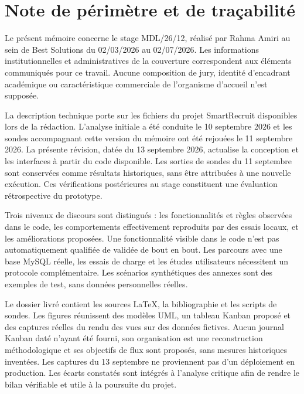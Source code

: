 \chapter*{Note de périmètre et de traçabilité}
Le présent mémoire concerne le stage MDL/26/12, réalisé par Rahma Amiri au sein de Best Solutions du 02/03/2026 au 02/07/2026. Les informations institutionnelles et administratives de la couverture correspondent aux éléments communiqués pour ce travail. Aucune composition de jury, identité d'encadrant académique ou caractéristique commerciale de l'organisme d'accueil n'est supposée.

La description technique porte sur les fichiers du projet SmartRecruit disponibles lors de la rédaction. L'analyse initiale a été conduite le 10 septembre 2026 et les sondes accompagnant cette version du mémoire ont été rejouées le 11 septembre 2026. La présente révision, datée du 13 septembre 2026, actualise la conception et les interfaces à partir du code disponible. Les sorties de sondes du 11 septembre sont conservées comme résultats historiques, sans être attribuées à une nouvelle exécution. Ces vérifications postérieures au stage constituent une évaluation rétrospective du prototype.

Trois niveaux de discours sont distingués : les fonctionnalités et règles observées dans le code, les comportements effectivement reproduits par des essais locaux, et les améliorations proposées. Une fonctionnalité visible dans le code n'est pas automatiquement qualifiée de validée de bout en bout. Les parcours avec une base MySQL réelle, les essais de charge et les études utilisateurs nécessitent un protocole complémentaire. Les scénarios synthétiques des annexes sont des exemples de test, sans données personnelles réelles.

Le dossier livré contient les sources LaTeX, la bibliographie et les scripts de sondes. Les figures réunissent des modèles UML, un tableau Kanban proposé et des captures réelles du rendu des vues sur des données fictives. Aucun journal Kanban daté n'ayant été fourni, son organisation est une reconstruction méthodologique et ses objectifs de flux sont proposés, sans mesures historiques inventées. Les captures du 13 septembre ne proviennent pas d'un déploiement en production. Les écarts constatés sont intégrés à l'analyse critique afin de rendre le bilan vérifiable et utile à la poursuite du projet.

\tableofcontents
\clearpage
{}
\listoffigures
\clearpage
{}
\listoftables
